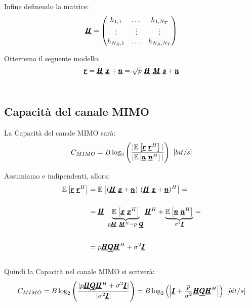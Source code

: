 Infine definendo la matrice:
\begin{equation*}
    \pmb{\underline{H}}=
    \begin{pmatrix}
    h_{1,1} & \dots & h_{1,N_T} \\
    \vdots & \vdots & \vdots \\
    h_{N_R,1} & \dots & h_{N_R,N_T}
    \end{pmatrix}
\end{equation*}

Otterremo il seguente modello:
\begin{equation*}
    \pmb{\underline{r}} = \pmb{\underline{H}} \ \pmb{\underline{x}} + \pmb{\underline{n}} = \sqrt{p} \ \pmb{\underline{H}} \ \pmb{\underline{M}} \ \pmb{\underline{s}} + \pmb{\underline{n}}
\end{equation*}
\\

\subsection{Capacità del canale MIMO}
La Capacità del canale MIMO sarà:
\begin{equation*}
    C_{MIMO} = B\log_2 \left(\frac{|\av{\vc{r} \ \vc{r}^H}|}{|\av{\vc{n} \ \vc{n}^H}|}\right) \ [bit/s]
\end{equation*}

Assumiamo  e  indipendenti, allora:\\
\begin{equation*}
    \begin{aligned}
    \av{\vc{r} \ \vc{r}^H} & = \av{(\vc{H} \ \vc{x} + \vc{n}) \ (\vc{H} \ \vc{x} + \vc{n})^H} = \\ \\
    & = \vc{H} \ \underbrace{\av{\vc{x} \ \vc{x}^H}}_{p\vc{M} \ \vc{M}^H = p \ \vc{Q}} \vc{H}^H + \underbrace{\av{\vc{n} \ \vc{n}^H}}_{\sigma^2\vc{I}} = \\ \\
    & = p\vc{H}\vc{Q}\vc{H}^H + \sigma^2\vc{I}
    \end{aligned}
\end{equation*}
\\

Quindi la Capacità nel canale MIMO si scriverà:
\begin{equation*}
    C_{MIMO} = B\log_2 \left(\frac{| p\pmb{\underline{H}}\pmb{\underline{Q}}\pmb{\underline{H}}^H + \sigma^2\pmb{\underline{I}}|}{|\sigma^2\pmb{\underline{I}}|}\right) = B\log_2 \left(\left| \pmb{\underline{I}} + \frac{p}{\sigma^2}\pmb{\underline{H}}\pmb{\underline{Q}}\pmb{\underline{H}}^H \right|\right)  \ [bit/s]
\end{equation*}
\\

